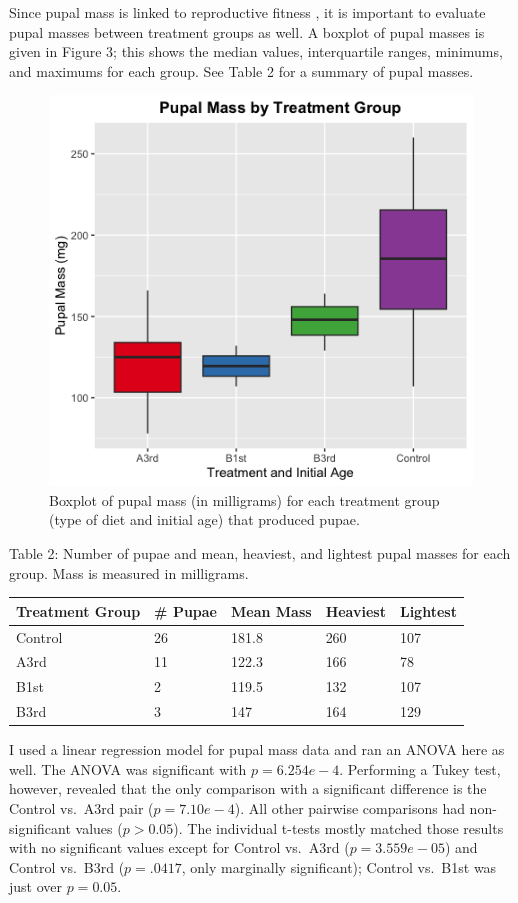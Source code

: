 \documentclass[12pt,]{article}
\begin{document}
Since pupal mass is linked to reproductive fitness
\autocite{garvey_examining_2022}, it is important to evaluate pupal
masses between treatment groups as well. A boxplot of pupal masses is
given in Figure 3; this shows the median values, interquartile ranges,
minimums, and maximums for each group. See Table 2 for a summary of
pupal masses.

\begin{figure}

{\centering \includegraphics[width=0.5\linewidth]{../Figures/Figure_3} 

}

\caption{Boxplot of pupal mass (in milligrams) for each treatment group (type of diet and initial age) that produced pupae.}\label{fig:Figure3}
\end{figure}

Table 2: Number of pupae and mean, heaviest, and lightest pupal masses
for each group. Mass is measured in milligrams.

\begin{longtable}[]{@{}lllll@{}}
\toprule\noalign{}
Treatment Group & \# Pupae & Mean Mass & Heaviest & Lightest \\
\midrule\noalign{}
\endhead
\bottomrule\noalign{}
\endlastfoot
Control & 26 & 181.8 & 260 & 107 \\
A3rd & 11 & 122.3 & 166 & 78 \\
B1st & 2 & 119.5 & 132 & 107 \\
B3rd & 3 & 147 & 164 & 129 \\
\end{longtable}

I used a linear regression model for pupal mass data and ran an ANOVA
here as well. The ANOVA was significant with \(p = 6.254e-4\).
Performing a Tukey test, however, revealed that the only comparison with
a significant difference is the Control vs.~A3rd pair (\(p = 7.10e-4\)).
All other pairwise comparisons had non-significant values
(\(p > 0.05\)). The individual t-tests mostly matched those results with
no significant values except for Control vs.~A3rd (\(p = 3.559e-05\))
and Control vs.~B3rd (\(p = .0417\), only marginally significant);
Control vs.~B1st was just over \(p = 0.05\).
\end{document}
